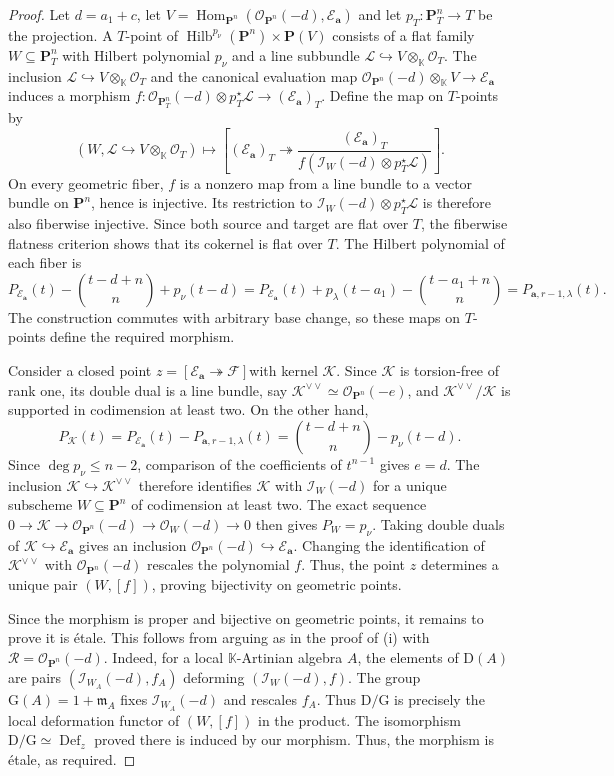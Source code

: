 \documentclass[leqno,11pt,a4paper]{amsart}
\theoremstyle{definition}
\numberwithin{equation}{section}
\newcommand{\kk}{\mathbb{K}}
\newcommand{\bfa}{\mathbf{a}}
\newcommand{\PP}{\mathbf{P}}
\newcommand{\EE}{\mathscr{E}}
\newcommand{\FF}{\mathscr{F}}
\newcommand{\OO}{\mathscr{O}}
\newcommand{\RR}{\mathscr{R}}
\newcommand{\II}{\mathscr{I}}
\newcommand{\KK}{\mathscr{K}}
\newcommand{\LLL}{\mathscr{L}}
\DeclareMathOperator{\Hom}{Hom}
\DeclareMathOperator{\Def}{Def}
\DeclareMathOperator{\Hilb}{Hilb}
\begin{document}
\begin{proof} 
Let $d=a_1+c$, let $V=\Hom_{\PP^n}(\OO_{\PP^n}(-d),\EE_{\bfa})$ and let $p_T:\PP^n_T\to T$ be the projection.
A $T$-point of $\Hilb^{p_\nu}(\PP^n)\times\PP(V)$ consists of a flat family $W\subseteq\PP^n_T$ with Hilbert polynomial $p_\nu$ and a line subbundle $\LLL\hookrightarrow V\otimes_\kk\OO_T$.
The inclusion $\mathscr L\hookrightarrow V\otimes_\kk\OO_T$ and the canonical evaluation map $\OO_{\PP^n}(-d)\otimes_\kk V\rightarrow\EE_{\bfa}$ induces a morphism $f:\OO_{\PP^n_T}(-d)\otimes p_T^\star\LLL \rightarrow(\EE_{\bfa})_T$.
Define the map on $T$-points by
$$
(W,\LLL\hookrightarrow V\otimes_\kk\OO_T) \mapsto \left[(\EE_{\bfa})_T\twoheadrightarrow \frac{(\EE_{\bfa})_T}{f(\II_W(-d)\otimes p_T^\star\LLL)}
\right].
$$
On every geometric fiber, $f$ is a nonzero map from a line bundle to a vector bundle on $\PP^n$, hence is injective.
Its restriction to $\II_W(-d)\otimes p_T^\star\LLL$ is therefore also fiberwise injective. 
Since both source and target are flat over $T$, the fiberwise flatness criterion shows that its cokernel is flat over $T$.
The Hilbert polynomial of each fiber is
$$
P_{\EE_{\bfa}}(t)-\binom{t-d+n}{n}+p_\nu(t-d) =
P_{\EE_{\bfa}}(t) + p_\lambda(t-a_1)-\binom{t-a_1+n}{n} = P_{\bfa,r-1,\lambda}(t).
$$
The construction commutes with arbitrary base change, so these maps on $T$-points define the required morphism.

Consider a closed point $z=[\EE_{\bfa}\twoheadrightarrow\FF]$with kernel $\KK$. 
Since $\KK$ is torsion-free of rank one, its double dual is a line bundle, say $\KK^{\vee\vee} \simeq \OO_{\PP^n}(-e)$, and $\KK^{\vee\vee}/\KK$ is supported in codimension at least two.
On the other hand,
$$
P_{\KK}(t) = P_{\EE_{\bfa}}(t)-P_{\bfa,r-1,\lambda}(t) = \binom{t-d+n}{n}-p_\nu(t-d).
$$
Since $\deg p_\nu\leq n-2$, comparison of the coefficients of $t^{n-1}$ gives $e=d$.
The inclusion $\KK\hookrightarrow\KK^{\vee\vee}$ therefore identifies $\KK$ with $\II_W(-d)$ for a unique subscheme $W\subseteq\PP^n$ of codimension at least two.
The exact sequence $0 \to \KK\to\OO_{\PP^n}(-d) \to\OO_W(-d)\to 0$ then gives $P_W=p_\nu$.
Taking double duals of $\KK\hookrightarrow\EE_{\bfa}$ gives an inclusion $\OO_{\PP^n}(-d) \hookrightarrow \EE_{\bfa}$.
Changing the identification of $\KK^{\vee\vee}$ with $\OO_{\PP^n}(-d)$ rescales the polynomial $f$.
Thus, the point $z$ determines a unique pair $(W,[f])$, proving bijectivity on geometric points.

Since the morphism is proper and bijective on geometric points, it remains to prove it is \'etale.
This follows from arguing as in the proof of  (i) with $\RR=\OO_{\PP^n}(-d)$.
Indeed, for a local $\kk$-Artinian algebra $A$, the elements of $\mathrm{D}(A)$ are pairs $(\II_{W_A}(-d),f_A)$ deforming $(\II_W(-d),f)$. 
The group $\mathrm G(A)=1+\mathfrak m_A$ fixes $\II_{W_A}(-d)$ and rescales $f_A$.
Thus $\mathrm D/\mathrm G$ is precisely the local deformation functor of $(W,[f])$ in the product.
The isomorphism $\mathrm D/\mathrm G\simeq\Def_z$ proved there is induced by our morphism. 
Thus, the morphism is \'etale, as required.
\end{proof}
\end{document}
